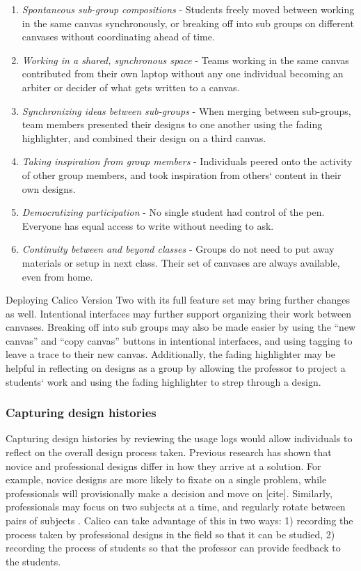 \begin{enumerate}
	\item \textit{Spontaneous sub-group compositions} - Students freely moved between working in the same canvas synchronously, or breaking off into sub groups on different canvases without coordinating ahead of time.
	\item \textit{Working in a shared, synchronous space} - Teams working in the same canvas contributed from their own laptop without any one individual becoming an arbiter or decider of what gets written to a canvas.
	\item \textit{Synchronizing ideas between sub-groups} - When merging between sub-groups, team members presented their designs to one another using the fading highlighter, and combined their design on a third canvas.
	\item \textit{Taking inspiration from group members} - Individuals peered onto the activity of other group members, and took inspiration from others` content in their own designs.
	\item \textit{Democratizing participation} - No single student had control of the pen. Everyone has equal access to write without needing to ask.
	\item \textit{Continuity between and beyond classes} - Groups do not need to put away materials or setup in next class. Their set of canvases are always available, even from home.
\end{enumerate}

Deploying Calico Version Two with its full feature set may bring further changes as well. Intentional interfaces may further support organizing their work between canvases. Breaking off into sub groups may also be made easier by using the ``new canvas'' and ``copy canvas'' buttons in intentional interfaces, and using tagging to leave a trace to their new canvas. Additionally, the fading highlighter may be helpful in reflecting on designs as a group by allowing the professor to project a students` work and using the fading highlighter to strep through a design.

\subsubsection{Capturing design histories}
\label{discussion:other:design-histories}

Capturing design histories by reviewing the usage logs would allow individuals to reflect on the overall design process taken. Previous research has shown that novice and professional designs differ in how they arrive at a solution. For example, novice designs are more likely to fixate on a single problem, while professionals will provisionally make a decision and move on [cite]. Similarly, professionals may focus on two subjects at a time, and regularly rotate between pairs of subjects \cite{Baker2010590}. 
Calico can take advantage of this in two ways: 1) recording the process taken by professional designs in the field so that it can be studied, 2) recording the process of students so that the professor can provide feedback to the students.

